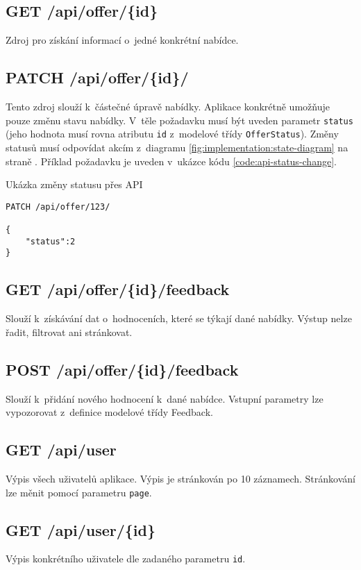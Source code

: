 \subsection{GET /api/offer/\{id\}}
Zdroj pro získání informací o~jedné konkrétní nabídce.

\subsection{PATCH /api/offer/\{id\}/}
Tento zdroj slouží k~částečné úpravě nabídky. Aplikace konkrétně umožňuje pouze změnu stavu nabídky. V~těle požadavku musí být uveden parametr \texttt{status} (jeho hodnota musí rovna atributu \texttt{id} z~modelové třídy \texttt{OfferStatus}). Změny statusů musí odpovídat akcím z~diagramu \ref{fig:implementation:state-diagram} na straně \pageref{fig:implementation:state-diagram}. Příklad požadavku je uveden v~ukázce kódu \ref{code:api-status-change}.

\begin{listing}[htbp]
\caption{\label{code:api-status-change}Ukázka změny statusu přes API}
\begin{verbatim}
PATCH /api/offer/123/

{
    "status":2
}
\end{verbatim}
\end{listing}


\subsection{GET /api/offer/\{id\}/feedback}
Slouží k~získávání dat o~hodnoceních, které se týkají dané nabídky. Výstup nelze řadit, filtrovat ani stránkovat.

\subsection{POST /api/offer/\{id\}/feedback}
Slouží k~přidání nového hodnocení k~dané nabídce. Vstupní parametry lze vypozorovat z~definice modelové třídy Feedback.

\subsection{GET /api/user}
Výpis všech uživatelů aplikace. Výpis je stránkován po 10 záznamech. Stránkování lze měnit pomocí parametru \texttt{page}.

\subsection{GET /api/user/\{id\}}
Výpis konkrétního uživatele dle zadaného parametru \texttt{id}.

